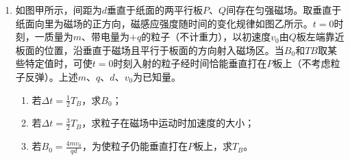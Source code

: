 \begin{enumerate}[leftmargin=0em]
\newpage
\item
{}
如图甲所示，间距为$ d $垂直于纸面的两平行板$ P $、$ Q $间存在匀强磁场。取垂直于纸面向里为磁场的正方向，磁感应强度随时间的变化规律如图乙所示。$ t=0 $时刻，一质量为$ m $、带电量为$ +q $的粒子（不计重力），以初速度$ v_{0} $由$ Q $板左端靠近板面的位置，沿垂直于磁场且平行于板面的方向射入磁场区。当$ B_{0} $和$ TB $取某些特定值时，可使$ t=0 $时刻入射的粒子经时间恰能垂直打在$ P $板上（不考虑粒子反弹）。上述$ m $、$ q $、$ d $、$ v_{0} $为已知量。
\begin{enumerate}
\renewcommand{\labelenumi}{\arabic{enumi}.}
\item
若$\Delta t = \frac { 1 } { 2 } T _ { B }$，求$ B_{0} $；
\item 
若$\Delta t = \frac { 3 } { 2 } T _ { B }$，求粒子在磁场中运动时加速度的大小；
\item 
若$B _ { 0 } = \frac { 4 m v _ { 0 } } { q d }$，为使粒子仍能垂直打在$ P $板上，求$ T_B $。



\end{enumerate}
\begin{figure}[h!]
\flushright

\end{figure}


\end{enumerate}
